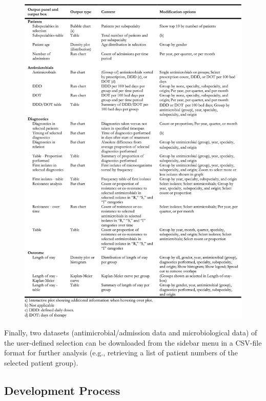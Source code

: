 \documentclass[
]{book}
\begin{document}
\begin{figure}

{\centering \includegraphics[width=1\linewidth]{images/05-t04} 

}

\end{figure}

Finally, two datasets (antimicrobial/admission data and microbiological data) of the user-defined selection can be downloaded from the sidebar menu in a CSV-file format for further analysis (e.g., retrieving a list of patient numbers of the selected patient group).

\hypertarget{development-process}{%
\subsection{Development Process}\label{development-process}}
\end{document}
